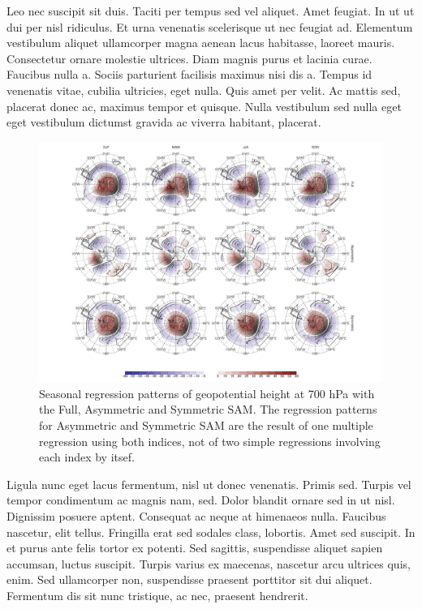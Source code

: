 \documentclass[twocol]{ametsocV5}
\begin{document}
Leo nec suscipit sit duis. Taciti per tempus sed vel aliquet. Amet
feugiat. In ut ut dui per nisl ridiculus. Et urna venenatis scelerisque
ut nec feugiat ad. Elementum vestibulum aliquet ullamcorper magna aenean
lacus habitasse, laoreet mauris. Consectetur ornare molestie ultrices.
Diam magnis purus et lacinia curae. Faucibus nulla a. Sociis parturient
facilisis maximus nisi dis a. Tempus id venenatis vitae, cubilia
ultricies, eget nulla. Quis amet per velit. Ac mattis sed, placerat
donec ac, maximus tempor et quisque. Nulla vestibulum sed nulla eget
eget vestibulum dictumst gravida ac viverra habitant, placerat.

\begin{figure}
\includegraphics{2d-regr-700-1} \caption[Seasonal regression patterns of geopotential height at 700 hPa with the Full, Asymmetric and Symmetric SAM]{Seasonal regression patterns of geopotential height at 700 hPa with the Full, Asymmetric and Symmetric SAM. The regression patterns for Asymmetric and Symmetric SAM are the result of one multiple regression using both indices, not of two simple regressions involving each index by itsef.}\label{fig:2d-regr-700}
\end{figure}

Ligula nunc eget lacus fermentum, nisl ut donec venenatis. Primis sed.
Turpis vel tempor condimentum ac magnis nam, sed. Dolor blandit ornare
sed in ut nisl. Dignissim posuere aptent. Consequat ac neque at
himenaeos nulla. Faucibus nascetur, elit tellus. Fringilla erat sed
sodales class, lobortis. Amet sed suscipit. In et purus ante felis
tortor ex potenti. Sed sagittis, suspendisse aliquet sapien accumsan,
luctus suscipit. Turpis varius ex maecenas, nascetur arcu ultrices quis,
enim. Sed ullamcorper non, suspendisse praesent porttitor sit dui
aliquet. Fermentum dis sit nunc tristique, ac nec, praesent hendrerit.
\end{document}
